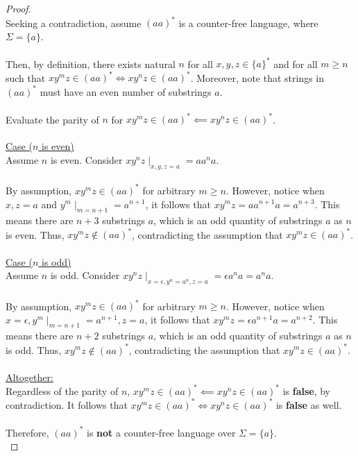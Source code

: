 \documentclass[12pt]{article}
\begin{document}
\begin{proof}
\leavevmode\\
    Seeking a contradiction, assume $(aa)^*$ is a counter-free language, where $\Sigma = \{a\}$. \\
    \\
    Then, by definition, there exists natural $n$ for all $x, y, z \in \{a\}^*$ and for all $m \geq n$ such that $xy^mz \in (aa)^* \iff xy^nz \in (aa)^*$. Moreover, note that strings in $(aa)^*$ must have an even number of substrings $a$. \\
    \\
    Evaluate the parity of $n$ for $xy^mz \in (aa)^* \impliedby xy^nz \in (aa)^*$. \\
    \\
    \underline{Case ($n$ is even)} \\
    Assume $n$ is even. Consider $xy^nz \mid_{x, y, z = a} = aa^na$. \\
    \\
    By assumption, $xy^mz \in (aa)^*$ for arbitrary $m \geq n$. However, notice when $x, z = a$ and $y^m \mid_{m = n + 1} = a^{n + 1}$, it follows that $xy^mz = aa^{n + 1}a = a^{n + 3}$. This means there are $n + 3$ substrings $a$, which is an odd quantity of substrings $a$ as $n$ is even. Thus, $xy^mz \notin (aa)^*$, contradicting the assumption that $xy^mz \in (aa)^*$. \\
    \\
    \underline{Case ($n$ is odd)} \\
    Assume $n$ is odd. Consider $xy^nz \mid_{x = \epsilon, y^n = a^n, z = a} = \epsilon a^na = a^na$. \\
    \\
    By assumption, $xy^mz \in (aa)^*$ for arbitrary $m \geq n$. However, notice when $x = \epsilon, y^m \mid_{m = n + 1} = a^{n + 1}, z = a$, it follows that $xy^mz = \epsilon a^{n + 1} a = a^{n + 2}$. This means there are $n + 2$ substrings $a$, which is an odd quantity of substrings $a$ as $n$ is odd. Thus, $xy^mz \notin (aa)^*$, contradicting the assumption that $xy^mz \in (aa)^*$. \\
    \\
    \underline{Altogether:} \\
    Regardless of the parity of $n$, $xy^mz \in (aa)^* \impliedby xy^nz \in (aa)^*$ is \textbf{false}, by contradiction. It follows that $xy^mz \in (aa)^* \iff xy^nz \in (aa)^*$ is \textbf{false} as well. \\
    \\
    Therefore, $(aa)^*$ is \textbf{not} a counter-free language over $\Sigma = \{a\}$. \\
\end{proof}
\pagebreak
\end{document}
